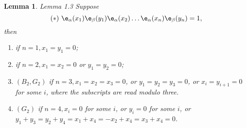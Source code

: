 \documentclass{memo-l}
\newtheorem{lemma}[theorem]{Lemma}
\theoremstyle{definition}
\theoremstyle{remark}
\numberwithin{section}{chapter}
\numberwithin{equation}{chapter}
\begin{document}
\begin{lemma}{Lemma 1.3}   Suppose
\[
{(*)}\
{\e}_{\alpha}(x_{1}){\e}_{\beta}(y_{1})
{\e}_{\alpha}(x_{2})\ldots {\e}_{\alpha}(x_{n})
{\e}_{\beta}(y_{n}) = 1,
\]
then

\begin{enumerate}[label=\alph*)]
\item if $n = 1, x_{1} = y_{1} = 0$;
\item if  $n = 2, x_{1} = x_{2} = 0$ or $y_{1} = y_{2} = 0$;
\item $(B_{2}, G_{2})$ if $n = 3, x_{1} = x_{2} = x_{3} = 0$, or
$y_{1} = y_{2} = y_{3} = 0$,
or $x_{i} = y_{i+1} = 0$ for some $i$, where the subscripts are
read modulo three.
\item $(G_{2})$ if $n = 4, x_{i} = 0$ for some $i$, or $y_{i} = 0$
for some $i$, or
\newline
$y_{1}+y_{3} = y_{2}+y_{4} = x_{1}+x_{4} = -x_{2}+x_{4}
= x_{3}+x_{4} = 0$.
\end{enumerate}
\end{lemma}
\end{document}
